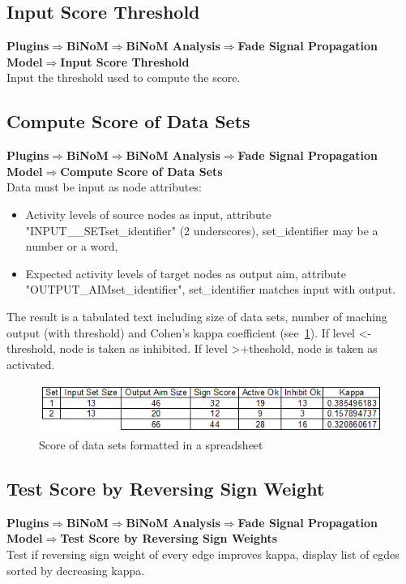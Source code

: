 \subsection{Input Score Threshold}
\textbf{Plugins$\Rightarrow$BiNoM$\Rightarrow$BiNoM Analysis$\Rightarrow$Fade Signal Propagation Model$\Rightarrow$Input Score Threshold}\\
Input the threshold used to compute the score. 

\subsection{Compute Score of Data Sets }
\textbf{Plugins$\Rightarrow$BiNoM$\Rightarrow$BiNoM Analysis$\Rightarrow$Fade Signal Propagation Model$\Rightarrow$Compute Score of Data Sets}\\
Data must be input as node attributes:
\begin{itemize}
\item Activity levels of source nodes as input, attribute "INPUT\_\_SETset\_identifier" (2 underscores), set\_identifier may be a number or a word, 
\item Expected activity levels of target nodes as output aim, attribute "OUTPUT\_AIMset\_identifier", set\_identifier matches input with output.
\end{itemize}
The result is a tabulated text including size of data sets, number of maching output (with threshold) and Cohen's kappa coefficient (see~\ref{Score_Of_Data_Sets}).
If level \textless -threshold, node is taken as inhibited. If level \textgreater +theshold, node is taken as activated.

\begin{figure}
\centering
\includegraphics[width=1.0\textwidth]{graphics/Score_Of_Data_Sets}
\caption{Score of data sets formatted in a spreadsheet}
\label{Score_Of_Data_Sets}
\end{figure}

\subsection{Test Score by Reversing Sign Weight }
\textbf{Plugins$\Rightarrow$BiNoM$\Rightarrow$BiNoM Analysis$\Rightarrow$Fade Signal Propagation Model$\Rightarrow$Test Score by Reversing Sign Weights}\\
Test if reversing sign weight of every edge improves kappa, display list of egdes sorted by decreasing kappa.

